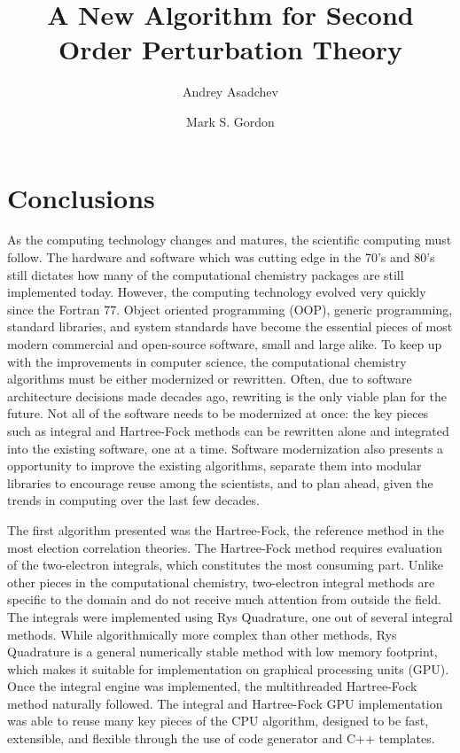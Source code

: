 \documentclass[12pt]{article} \usepackage[margin=1in]{geometry}
\begin{document}
\title{A New Algorithm for Second Order Perturbation Theory}
\author{Andrey Asadchev \and Mark S. Gordon}
\date{}

\maketitle

\section{Conclusions}
As the computing technology changes and matures, the scientific
computing must follow.  The hardware and software which was cutting
edge in the 70's and 80's still dictates how many of the computational
chemistry packages are still implemented today.  However, the
computing technology evolved very quickly since the Fortran 77.
Object oriented programming (OOP), generic programming, standard
libraries, and system standards have become the essential pieces of
most modern  commercial and open-source software, small and large
alike.  To keep up with the improvements in computer science, the
computational chemistry algorithms must be either modernized or
rewritten.  Often, due to software architecture decisions made decades
ago, rewriting is the only viable plan for the future.
Not all of the software needs to be  modernized at once:  the key
pieces such as integral and Hartree-Fock methods can be rewritten
alone and integrated into the existing software, one at a time.
Software modernization also presents a opportunity to improve the
existing algorithms, separate them into modular libraries to encourage
reuse among the scientists, and to plan ahead, given the trends in
computing over the last few decades.


The first algorithm presented was the Hartree-Fock, the reference
method in the most election correlation theories.  The Hartree-Fock
method requires evaluation of the two-electron integrals, which
constitutes the most consuming part.  Unlike other pieces in the
computational chemistry, two-electron integral methods are specific to
the domain and do not receive much attention from outside the field.
The integrals were implemented using Rys Quadrature, one out of
several integral methods.  While algorithmically more complex than
other methods, Rys Quadrature is a general numerically stable method
with low memory footprint, which makes it suitable for implementation
on graphical processing units (GPU).  Once the integral engine was
implemented, the multithreaded Hartree-Fock method naturally followed.
The integral and Hartree-Fock GPU implementation was able to reuse
many key pieces of the CPU algorithm, designed to be fast, extensible,
and flexible through the use of code generator and C++ templates.
\end{document}
